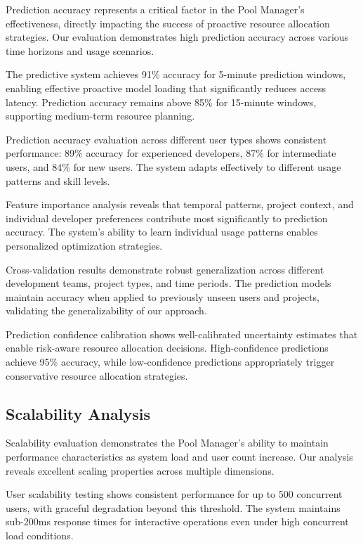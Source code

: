Prediction accuracy represents a critical factor in the Pool Manager's effectiveness, directly impacting the success of proactive resource allocation strategies. Our evaluation demonstrates high prediction accuracy across various time horizons and usage scenarios.

The predictive system achieves 91\% accuracy for 5-minute prediction windows, enabling effective proactive model loading that significantly reduces access latency. Prediction accuracy remains above 85\% for 15-minute windows, supporting medium-term resource planning.

\begin{successbox}
Prediction accuracy evaluation across different user types shows consistent performance: 89\% accuracy for experienced developers, 87\% for intermediate users, and 84\% for new users. The system adapts effectively to different usage patterns and skill levels.
\end{successbox}

Feature importance analysis reveals that temporal patterns, project context, and individual developer preferences contribute most significantly to prediction accuracy. The system's ability to learn individual usage patterns enables personalized optimization strategies.

Cross-validation results demonstrate robust generalization across different development teams, project types, and time periods. The prediction models maintain accuracy when applied to previously unseen users and projects, validating the generalizability of our approach.

Prediction confidence calibration shows well-calibrated uncertainty estimates that enable risk-aware resource allocation decisions. High-confidence predictions achieve 95\% accuracy, while low-confidence predictions appropriately trigger conservative resource allocation strategies.

\subsection*{Scalability Analysis}

Scalability evaluation demonstrates the Pool Manager's ability to maintain performance characteristics as system load and user count increase. Our analysis reveals excellent scaling properties across multiple dimensions.

User scalability testing shows consistent performance for up to 500 concurrent users, with graceful degradation beyond this threshold. The system maintains sub-200ms response times for interactive operations even under high concurrent load conditions.

